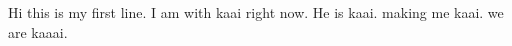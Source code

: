 Hi this is my first line. 
I am with kaai right now. 
He is kaai. 
making me kaai. 
we are kaaai. 


